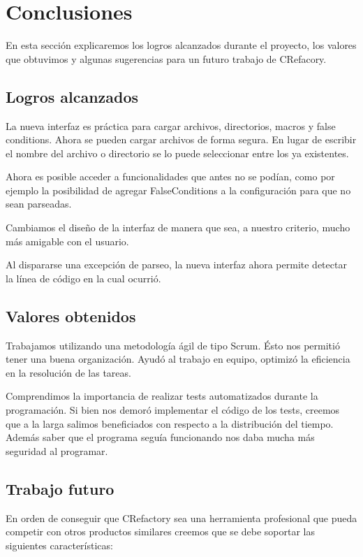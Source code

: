 \documentclass[a4paper,oneside,12pt]{article}
\begin{document}
\section{Conclusiones}
En esta secci\'on explicaremos los logros alcanzados durante el proyecto, los valores que obtuvimos y algunas sugerencias para un futuro trabajo de CRefacory.

\subsection{Logros alcanzados}
La nueva interfaz es pr\'actica para cargar archivos, directorios, macros y false conditions. Ahora se pueden cargar archivos de forma segura. En lugar de escribir el nombre del archivo o directorio se lo puede seleccionar entre los ya existentes. 

Ahora es posible acceder a funcionalidades que antes no se pod\'ian, como por ejemplo la posibilidad de agregar FalseConditions a la configuraci\'on para que no sean parseadas.

Cambiamos el diseño de la interfaz de manera que sea, a nuestro criterio, mucho m\'as amigable con el usuario.

Al dispararse una excepci\'on de parseo, la nueva interfaz ahora permite detectar la línea de código en la cual ocurrió.

\subsection{Valores obtenidos}
Trabajamos utilizando una metodología \'agil de tipo Scrum. Ésto nos permiti\'o tener una buena organizaci\'on. Ayud\'o al trabajo en equipo, optimiz\'o la eficiencia en la resoluci\'on de las tareas.

Comprendimos la importancia de realizar tests automatizados durante la programaci\'on. Si bien nos demor\'o implementar el c\'odigo de los tests, creemos que a la larga salimos beneficiados con respecto a la distribuci\'on del tiempo. Además saber que el programa segu\'ia funcionando nos daba mucha más seguridad al programar.

\subsection{Trabajo futuro}
En orden de conseguir que CRefactory sea una herramienta profesional que pueda competir con otros productos similares creemos que se debe soportar las siguientes caracter\'isticas:
\end{document}
